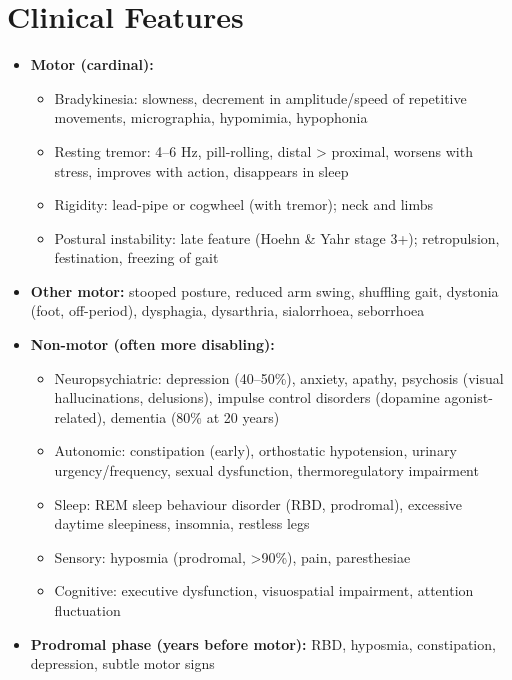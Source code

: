 \section*{Clinical Features}
\begin{itemize}
    \item \textbf{Motor (cardinal):}
    \begin{itemize}
        \item Bradykinesia: slowness, decrement in amplitude/speed of repetitive movements, micrographia, hypomimia, hypophonia
        \item Resting tremor: 4--6 Hz, pill-rolling, distal > proximal, worsens with stress, improves with action, disappears in sleep
        \item Rigidity: lead-pipe or cogwheel (with tremor); neck and limbs
        \item Postural instability: late feature (Hoehn \& Yahr stage 3+); retropulsion, festination, freezing of gait
    \end{itemize}
    \item \textbf{Other motor:} stooped posture, reduced arm swing, shuffling gait, dystonia (foot, off-period), dysphagia, dysarthria, sialorrhoea, seborrhoea
    \item \textbf{Non-motor (often more disabling):}
    \begin{itemize}
        \item Neuropsychiatric: depression (40--50\%), anxiety, apathy, psychosis (visual hallucinations, delusions), impulse control disorders (dopamine agonist-related), dementia (80\% at 20 years)
        \item Autonomic: constipation (early), orthostatic hypotension, urinary urgency/frequency, sexual dysfunction, thermoregulatory impairment
        \item Sleep: REM sleep behaviour disorder (RBD, prodromal), excessive daytime sleepiness, insomnia, restless legs
        \item Sensory: hyposmia (prodromal, >90\%), pain, paresthesiae
        \item Cognitive: executive dysfunction, visuospatial impairment, attention fluctuation
    \end{itemize}
    \item \textbf{Prodromal phase (years before motor):} RBD, hyposmia, constipation, depression, subtle motor signs
\end{itemize}

